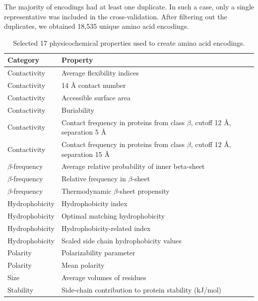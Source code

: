 \documentclass[fleqn,10pt,twoside]{gcb15submission}
\begin{document}
  The majority of encodings had at least one duplicate. In such a case, only a 
single representative was included in the cross-validation. After filtering out the 
duplicates, we obtained 18,535 unique amino acid encodings.

\begin{table}[bth]
\caption{Selected 17 physicochemical properties used to create amino acid encodings.} 
\label{tab:properties}
\small
\begin{tabularx}{\columnwidth}{@{} lX @{}}
  \toprule
  Category & Property \\ 
  \midrule
  Contactivity & Average flexibility indices \citep{bhaskaran_positional_1988} 
\\ 
  \rowcolor[gray]{0.85}Contactivity & 14 {\AA} contact number 
\citep{nishikawa_radial_1986} \\ 
  Contactivity & Accessible surface area \citep{radzicka_comparing_1988} \\ 
  \rowcolor[gray]{0.85}Contactivity & Buriability \citep{zhou_quantifying_2004} 
\\ 
  Contactivity & Contact frequency in proteins from class $\beta$, cutoff 
12 {\AA}, separation 5 {\AA} \citep{wozniak_characteristics_2014} \\ 
  \rowcolor[gray]{0.85}Contactivity & Contact frequency in proteins from class 
$\beta$, cutoff 12 {\AA}, separation 15 {\AA}
\citep{wozniak_characteristics_2014} \\ 
\hline 
  $\beta$-frequency & Average relative probability of inner \newline beta-sheet 
\citep{kanehisa_local_1980} \\ 
  \rowcolor[gray]{0.85}$\beta$-frequency & Relative frequency in $\beta$-sheet 
\citep{prabhakaran_distribution_1990} \\ 
  $\beta$-frequency & Thermodynamic $\beta$-sheet propensity 
\citep{kim_thermodynamic_1993} \\ 
\hline 
 \rowcolor[gray]{0.85} Hydrophobicity & Hydrophobicity index 
\citep{argos_structural_1982} \\ 
  Hydrophobicity & Optimal matching hydrophobicity 
\citep{sweet_correlation_1983} \\ 
  \rowcolor[gray]{0.85}Hydrophobicity & Hydrophobicity-related index 
\citep{kidera_statistical_1985} \\ 
  Hydrophobicity & Scaled side chain hydrophobicity values 
\citep{black_development_1991} \\ 
\hline 
  \rowcolor[gray]{0.85}Polarity & Polarizability parameter 
\citep{charton_structural_1982} \\
  Polarity & Mean polarity \citep{radzicka_comparing_1988} \\ 
  \hline 
  \rowcolor[gray]{0.85}Size & Average volumes of residues 
\citep{pontius_deviations_1996} \\ 
\hline 
  Stability & Side-chain contribution to protein stability (kJ/mol) 
\citep{takano_new_2001} \\
  \bottomrule
\end{tabularx}
\end{table}
\end{document}
